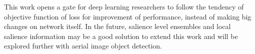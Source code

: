 \documentclass[conference]{IEEEtran}
\begin{document}
    This work opens a gate for deep learning researchers to follow the tendency of objective function of loss for improvement of performance, instead of making big changes on network itself. In the future, salience level ensembles and local salience information may be a good solution to extend this work and will be explored further with aerial image object detection.






\end{document}
